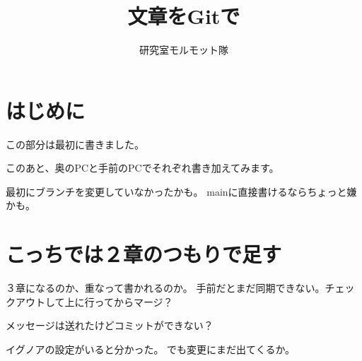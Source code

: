 \documentclass[a4j]{ujarticle}
\title{文章をGitで}
\author{研究室モルモット隊}
\begin{document}
\maketitle
\tableofcontents

\section{はじめに}
この部分は最初に書きました。

このあと、奥のPCと手前のPCでそれぞれ書き加えてみます。

最初にブランチを変更していなかったかも。
mainに直接書けるならちょっと嫌かも。

\section{こっちでは２章のつもりで足す}
３章になるのか、重なって書かれるのか。
手前だとまだ同期できない。チェックアウトして上に行ってからマージ？

メッセージは送れたけどコミットができない？

イグノアの設定がいると分かった。
でも変更にまだ出てくるか。
\end{document}
